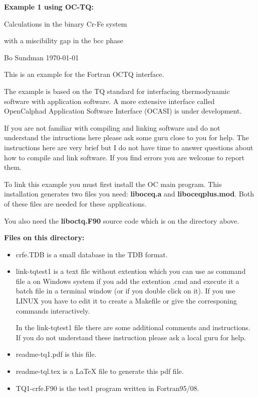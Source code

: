 \documentclass[12pt]{article}
\begin{document}
\begin{center}
{\Large \bf Example 1 using OC-TQ:

Calculations in the binary Cr-Fe  system

with a miscibility gap in the bcc phase

}

\bigskip

Bo Sundman \today

\end{center}

This is an example for the Fortran OCTQ interface.

The example is based on the TQ standard for interfacing thermodynamic
software with application software.  A more extensive interface called
OpenCalphad Application Software Interface (OCASI) is under
development.

If you are not familiar with compiling and linking software and do not
understand the intructions here please ask some guru close to you for
help.  The instructions here are very brief but I do not have time to
answer questions about how to compile and link software.  If you find
errors you are welcome to report them.

To link this example you must first install the OC main program.  This
installation generates two files you need: {\bf liboceq.a} and {\bf
  liboceqplus.mod}.  Both of these files are needed for these
applications.

You also need the {\bf liboctq.F90} source code which is on the
directory above.

\bigskip

{\bf Files on this directory:}
\begin{itemize}
\item crfe.TDB is a small database in the TDB format.
\item link-tqtest1 is a text file without extention which you can use
  as command file a on Windows system if you add the extention .cmd
  and execute it a batch file in a terminal window (or if you double
  click on it).  If you use LINUX you have to edit it to create a
  Makefile or give the corresponing commands interactively.

  In the link-tqtest1 file there are some additional comments and
  instructions.  If you do not understand these instruction please ask
  a local guru for help.
\item readme-tq1.pdf is this file.
\item readme-tql.tex is a LaTeX file to generate this pdf file.
\item TQ1-crfe.F90 is the test1 program written in Fortran95/08.
\end{itemize}
\end{document}
